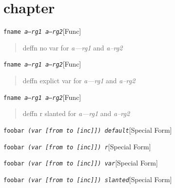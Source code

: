 \documentclass{book}
\begin{document}
\label{anchor:Top}%
\chapter{{chapter}}
\label{anchor:chapter}%

\noindent\texttt{fname \EmbracOn{}\textnormal{\textsl{a---rg1 a--rg2}}\EmbracOff{}}\hfill[Func]



%
\begin{quote}
\unskip{\parskip=0pt\noindent}%
deffn no var for \textsl{a---rg1} and \textsl{a--rg2}
\end{quote}

\noindent\texttt{fname \EmbracOn{}\textnormal{\textsl{\textsl{a---rg1} \textsl{a--rg2}}}\EmbracOff{}}\hfill[Func]



%
\begin{quote}
\unskip{\parskip=0pt\noindent}%
deffn explict var for \textsl{a---rg1} and \textsl{a--rg2}
\end{quote}

\noindent\texttt{fname \EmbracOn{}\textnormal{\textsl{\EmbracOff{}\textnormal{\textsl{a---rg1}}\EmbracOn{} \EmbracOff{}\textnormal{\textsl{a--rg2}}\EmbracOn{}}}\EmbracOff{}}\hfill[Func]



%
\begin{quote}
\unskip{\parskip=0pt\noindent}%
deffn r slanted for \textsl{a---rg1} and \textsl{a--rg2}
\end{quote}

\noindent\texttt{foobar \EmbracOn{}\textnormal{\textsl{(var [from to [inc]]) default}}\EmbracOff{}}\hfill[Special Form]



%
\noindent\texttt{foobar \EmbracOn{}\textnormal{\textsl{(var \EmbracOff{}\textnormal{[}\EmbracOn{}from to \EmbracOff{}\textnormal{[}\EmbracOn{}inc\EmbracOff{}\textnormal{]]}\EmbracOn{}) r}}\EmbracOff{}}\hfill[Special Form]



%
\noindent\texttt{foobar \EmbracOn{}\textnormal{\textsl{(var \textsl{[}from to \textsl{[}inc\textsl{]]}) var}}\EmbracOff{}}\hfill[Special Form]



%
\noindent\texttt{foobar \EmbracOn{}\textnormal{\textsl{(var \textsl{[}from to \textsl{[}inc\textsl{]]}) slanted}}\EmbracOff{}}\hfill[Special Form]
\end{document}
